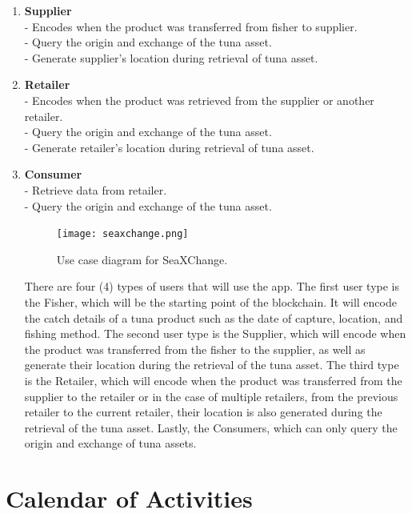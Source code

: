 \begin{itemize}
\begin{enumerate}
			\item \textbf{Supplier}
			\\- Encodes when the product was transferred from fisher to supplier.
			\\- Query the origin and exchange of the tuna asset.
			\\- Generate supplier's location during retrieval of tuna asset.
			
			\item \textbf{Retailer}
			\\- Encodes when the product was retrieved from the supplier or another retailer.
			\\- Query the origin and exchange of the tuna asset.
			\\- Generate retailer's location during retrieval of tuna asset.
			
			\item \textbf{Consumer}
			\\- Retrieve data from retailer.
			\\- Query the origin and exchange of the tuna asset.
		
			\begin{figure}[h]  
				\centering
				\texttt{[image: seaxchange.png]}
				\caption{Use case diagram for SeaXChange.}
				\label{fig:usecase}  
			\end{figure}
			
			There are four (4) types of users that will use the app. The first user type is the Fisher, which will be the starting point of the blockchain. It will encode the catch details of a tuna product such as the date of capture, location, and fishing method. The second user type is the Supplier, which will encode when the product was transferred from the fisher to the supplier, as well as generate their location during the retrieval of the tuna asset. The third type is the Retailer, which will encode when the product was transferred from the supplier to the retailer or in the case of multiple retailers, from the previous retailer to the current retailer, their location is also generated during the retrieval of the tuna asset. Lastly, the Consumers, which can only query the origin and exchange of tuna assets.
			
		\end{enumerate}
	\end{itemize}

\clearpage
\newpage
\section{Calendar of Activities}
%
%
\newcommand{\weekone}{\textbullet}
\newcommand{\weektwo}{\textbullet \textbullet}
\newcommand{\weekthree}{\textbullet \textbullet \textbullet}
\newcommand{\weekfour}{\textbullet \textbullet \textbullet \textbullet}

